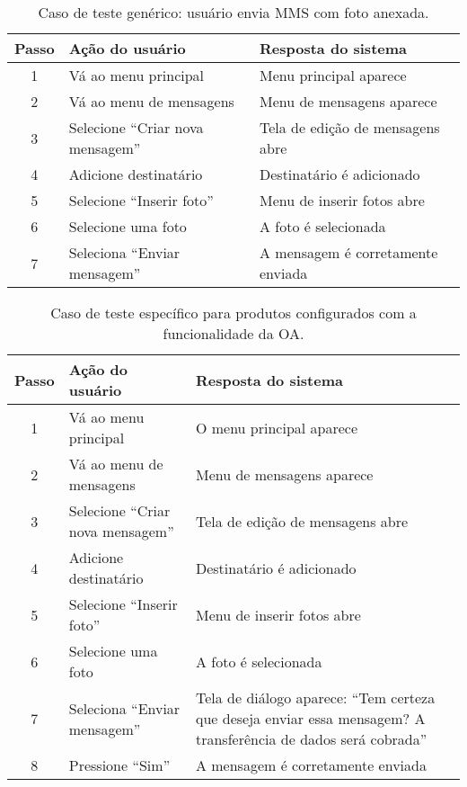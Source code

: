 \begin{table*}[!t] \footnotesize
  \centering
  \caption{Caso de teste genérico: usuário envia MMS com foto anexada.}
    \begin{tabular}{|c|p{7cm}|p{7cm}|}
    \hline
    \textbf{Passo} & \textbf{Ação do usuário} & \textbf{Resposta do sistema}
    \\
    \hline
    1    & Vá ao menu principal  & Menu principal aparece  \\
    \hline
    2    & Vá ao menu de mensagens  & Menu de mensagens aparece  \\
    \hline
    3    & Selecione ``Criar nova mensagem''  & Tela de edição de mensagens abre
    \\
    \hline
    4    & Adicione destinatário  & Destinatário é adicionado
    \\
    \hline
    5    & Selecione ``Inserir foto''  & Menu de inserir fotos abre
    \\
    \hline
    6    & Selecione uma foto  & A foto é selecionada \\
    \hline
    7    & Seleciona ``Enviar mensagem''  & A mensagem é corretamente enviada
    \\
    \hline
    \end{tabular}
  \label{tab:example1}
\end{table*}

\begin{table*} [!t] \footnotesize
  \centering
  \caption{Caso de teste específico para produtos configurados com a
  funcionalidade da OA.}
    \begin{tabular}{|c|p{7cm}|p{7cm}|}
    \hline
    \textbf{Passo} & \textbf{Ação do usuário} & \textbf{Resposta do sistema}
    \\
    \hline
    1    & Vá ao menu principal  & O menu principal aparece  \\
    \hline
    2    & Vá ao menu de mensagens  & Menu de mensagens aparece  \\
    \hline
    3    & Selecione ``Criar nova mensagem''  & Tela de edição de mensagens abre  \\
    \hline
    4    & Adicione destinatário  & Destinatário é adicionado \\
    \hline
    5    & Selecione ``Inserir foto''  & Menu de inserir fotos abre \\
    \hline
    6    & Selecione uma foto  & A foto é selecionada \\
    \hline
    7    & Seleciona ``Enviar mensagem''  & Tela de diálogo aparece: 
    ``Tem certeza que deseja enviar essa mensagem? A transferência de dados
    será cobrada'' \\
    \hline
    8    & Pressione ``Sim''  &  A mensagem é corretamente enviada
    \\
    \hline
    \end{tabular}
  \label{tab:specexample1}
\end{table*}

